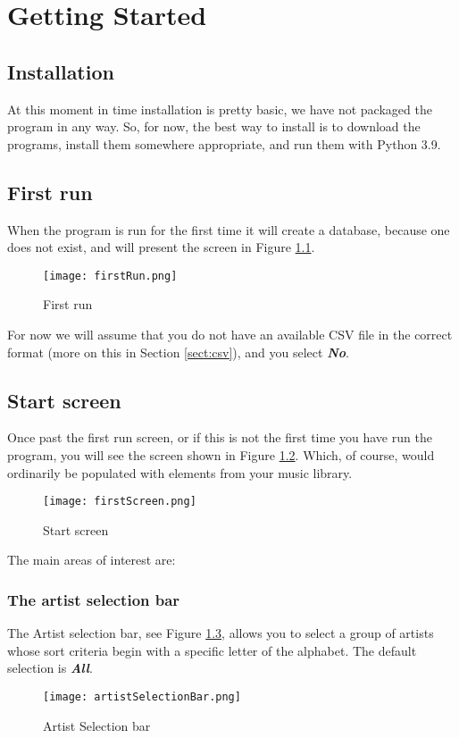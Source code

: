 \chapter{Getting Started}
\section{Installation}
At this moment in time installation is pretty basic, we have not packaged the program in any way.  So, for now, the best way to install is to download the programs, install them somewhere appropriate, and run them with Python 3.9.
 
\section{First run}
When the program is run for the first time it will create a database, because one does not exist, and will present the screen in Figure 
\ref{fig:First run}.
\begin{figure}[!h]
  \texttt{[image: firstRun.png]}
  \caption{First run}
  \label{fig:First run}
\end{figure}
For now we will assume that you do not have an available CSV file in the correct format (more on this in Section 
\ref{sect:csv}),
and you select 
\textbf{\textit{No}}.


\section{Start screen}
Once past the first run screen, or if this is not the first time you have run the program, you will see the screen shown in Figure 
\ref{fig:Start screen}.
Which, of course, would ordinarily be populated with elements from your music library.
\begin{figure}[!h]
  \texttt{[image: firstScreen.png]}
  \caption{Start screen}
  \label{fig:Start screen}
\end{figure}
The main areas of interest are:

\subsection{The artist selection bar}
The Artist selection bar, see Figure 
\ref{fig:Artist Selection bar},
allows you to select a group of artists whose sort criteria begin with a specific letter of the alphabet.  The default selection is 
\textbf{\textit{All}}.
\begin{figure}[!h]
  \texttt{[image: artistSelectionBar.png]}
  \caption{Artist Selection bar}
  \label{fig:Artist Selection bar}
\end{figure}
\newpage
